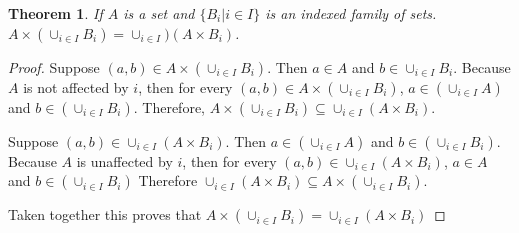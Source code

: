 

\newtheorem{theorem}{Theorem}

\begin{theorem}
  If $A$ is a set and $\{B_i | i \in I\}$ is an indexed family of sets. $A
  \times (\cup_{i\in I}B_i) =\cup_{i\in I})(A \times B_i)$.
\end{theorem}

\begin{proof}
  Suppose $(a,b) \in A \times (\cup_{i\in I}B_i)$. Then $a \in A$ and $b
  \in \cup_{i\in I}B_i$. Because $A$ is not affected by $i$, then for every
  $(a,b)\in A \times (\cup_{i\in I}B_i)$, $a \in (\cup_{i\in I}A)$ and $b
  \in (\cup_{i\in I}B_i)$. Therefore, $A \times (\cup_{i\in I}B_i) \subseteq
  \cup_{i\in I}(A \times B_i)$.

  Suppose $(a,b) \in \cup_{i\in I}(A \times B_i)$. Then $a \in (\cup_{i\in
  I}A)$ and $b \in (\cup_{i\in I}B_i)$. Because $A$ is unaffected by $i$,
  then for every $(a,b) \in \cup_{i\in I}(A \times B_i)$, $a \in A$ and $b \in
  (\cup_{i\in I}B_i)$ Therefore $\cup_{i\in I}(A \times B_i) \subseteq A \times
  (\cup_{i\in I}B_i)$.

  Taken together this proves that $A \times (\cup_{i\in I}B_i) =\cup_{i\in
  I}(A \times B_i)$
\end{proof}
